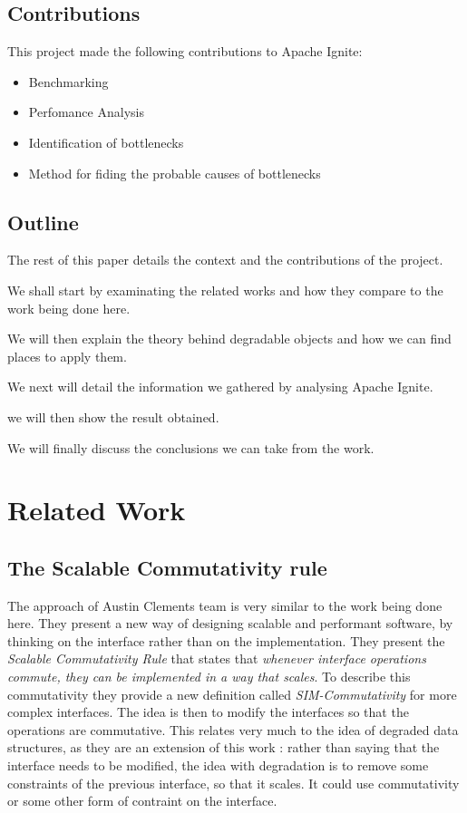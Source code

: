 \documentclass[conference]{IEEEtran}
\begin{document}
\subsection{Contributions}
This project made the following contributions to Apache Ignite:
\begin{itemize}
  \item Benchmarking
  \item Perfomance Analysis
  \item Identification of bottlenecks
  \item Method for fiding the probable causes of bottlenecks
\end{itemize}

\subsection{Outline}
The rest of this paper details the context and the contributions of the project.

We shall start by examinating the related works and how they compare to the work being done here.

We will then explain the theory behind degradable objects and how we can find places to apply them.

We next will detail the information we gathered by analysing Apache Ignite.

we will then show the result obtained.

We will finally discuss the conclusions we can take from the work.


\section{Related Work}
\subsection{The Scalable Commutativity rule}
The approach of Austin Clements \cite{scalable} team is very similar to the work being done here. They present a new way of designing scalable and performant software, by thinking on the interface rather than on the implementation. They present the \textit{Scalable Commutativity Rule} that states that \textit{whenever interface operations commute, they can be implemented in a way that scales}. To describe this commutativity they provide a new definition called \textit{SIM-Commutativity} for more complex interfaces. The idea is then to modify the interfaces so that the operations are commutative. This relates very much to the idea of degraded data structures, as they are an extension of this work : rather than saying that the interface needs to be modified, the idea with degradation is to remove some constraints of the previous interface, so that it scales. It could use commutativity or some other form of contraint on the interface.
\end{document}
